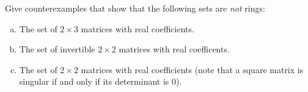 \begin{exercise}{}
Give counterexamples that show that the following sets are \emph{not} rings:
\begin{enumerate}[(a)]
\item
The set of $2 \times 3$ matrices with real coefficients.
\item
The set of invertible $2 \times 2$ matrices with real coefficents.
\item
The set of  $2 \times 2$ matrices with real coefficients (note that a square matrix is singular if and only if its determinant is 0).
\end{enumerate}
\end{exercise}
